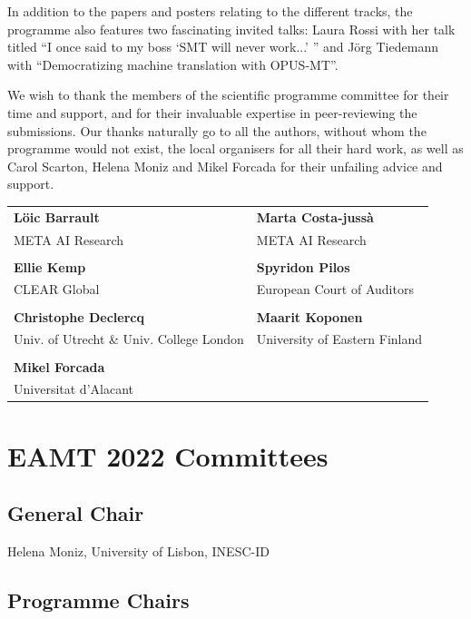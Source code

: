 \documentclass[a4paper,11pt,twoside]{book}
\begin{document}
\begin{onehalfspacing}
In addition to the papers and posters relating to the different tracks, the programme also features two fascinating invited talks: Laura Rossi with her talk titled ``I once said to my boss `SMT will never work...' '' and Jörg Tiedemann with ``Democratizing machine translation with OPUS-MT''.

We wish to thank the members of the scientific programme committee for their time and support, and for their invaluable expertise in peer-reviewing the submissions. Our thanks naturally go to all the authors, without whom the programme would not exist, the local organisers for all their hard work, as well as Carol Scarton, Helena Moniz and Mikel Forcada for their unfailing advice and support. 
\end{onehalfspacing}

\vspace{1cm}
\begin{center}
\begin{tabular}{p{7.5cm}p{7.5cm}}
\textbf{Löic Barrault} & \textbf{Marta Costa-jussà}\\
META AI Research & META AI Research\\\\
\textbf{Ellie Kemp} & \textbf{Spyridon Pilos}\\
CLEAR Global	 & European Court of Auditors\\\\
\textbf{Christophe Declercq} & \textbf{Maarit Koponen}\\
Univ. of Utrecht \&
Univ. College London	 & University of Eastern Finland\\\\
\textbf{Mikel Forcada} & \\
Universitat d'Alacant	 & 
\end{tabular}
\end{center}


\chapter*{EAMT 2022 Committees}

\section*{General Chair}
\noindent Helena Moniz, University of Lisbon, INESC-ID


\section*{Programme Chairs}
\end{document}

